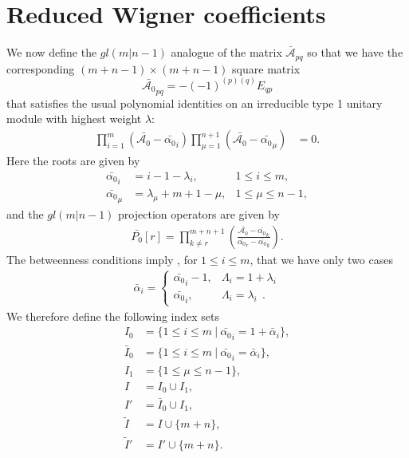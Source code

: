 \documentclass[12pt]{article}
\def\nn{\nonumber}
\begin{document}

\section{Reduced Wigner coefficients} 
\label{Wigner}
We now define the $gl(m|n-1)$ analogue of the matrix $\bar{\mathcal{A}}_{pq}$ so that we have the corresponding $(m+n-1) \times (m+n-1)$ square matrix
$$
\bar{\mathcal{A}_0}_{pq} = -(-1)^{(p)(q)} E_{qp}
$$
that satisfies the usual polynomial identities on an irreducible type 1 unitary module with highest weight $\lambda$:
\begin{align*}
\prod_{i=1}^m (\bar{\mathcal{A}_0} - \bar{\alpha_0}_i) \prod^{n+1}_{\mu = 1} (\bar{\mathcal{A}_0} - \bar{\alpha_0}_\mu) &= 0.
\end{align*}
Here the roots are given by
\begin{align*}
\bar{\alpha_0}_i  &= i - 1 -{\lambda}_i , &1\leq i\leq m, \\
\bar{\alpha_0}_\mu &= {\lambda}_\mu + m + 1 - \mu,  &1\leq \mu \leq n - 1,
\end{align*}
and the $gl(m|n-1)$ projection operators are given by
\begin{align}
\bar{P_0}[r] = \prod_{k\neq r}^{m+n+1}\left( \frac{\bar{\mathcal{A}_0}  -\bar{\alpha_0}_k}{\bar{\alpha_0}_r - \bar{\alpha_0}_k} \right).
\end{align}
The betweenness conditions imply 
\cite{GIW1}, for $1\leq i\leq m$, that we have only two cases
\begin{align}
\bar{\alpha}_i = \left\{ \begin{array}{rl}  \bar{\alpha_0}_i - 1,& \Lambda_i = 1+\lambda_i\\
                                    \bar{\alpha_0}_i,& \Lambda_i = \lambda_i  ~~.
\end{array} \right.
\nn
\end{align}
We therefore define the following index sets
\begin{align}
I_0 &=  \{ 1\leq i\leq m\ |\ \bar{\alpha_0}_i=1+\bar{\alpha}_i \},\nn\\
\bar{I}_0 &=  \{ 1\leq i\leq m\ |\ \bar{\alpha_0}_i=\bar{\alpha}_i  \},\nn\\
I_1 &= \{ 1\leq\mu\leq n-1\},\nn\\
I &= I_0\cup I_1,\nn\\
I'&= \bar{I}_0\cup I_1,\nn\\
\tilde{I} &= I\cup \{m+n\},\nn\\
\tilde{I}' &= I'\cup \{m+n\}.
\label{DefIndexSets1} 
\end{align}
\end{document}
